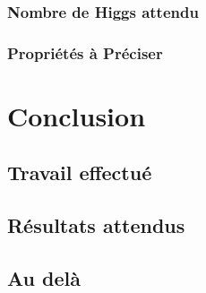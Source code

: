 \documentclass[10pt,a4paper]{report}
\begin{document}
\subsection{Nombre de Higgs attendu}

\subsection{Propriétés à Préciser}

\chapter{Conclusion}

\section{Travail effectué}

\section{Résultats attendus}

\section{Au delà}

\end{document}

